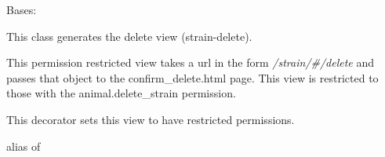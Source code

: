 \documentclass[letterpaper,10pt,english]{sphinxmanual}
\begin{document}
\begin{fulllineitems}
\label{api:mousedb.animal.views.StrainDelete}
Bases: \href{http://docs.djangoproject.com/en/dev/ref/class-based-views/\#django.views.generic.edit.DeleteView}{}

This class generates the delete {\hyperref[api:mousedb.animal.models.Strain]{}} view (strain-delete).

This permission restricted view takes a url in the form \emph{/strain/\#/delete} and passes that object to the confirm\_delete.html page.
This view is restricted to those with the animal.delete\_strain permission.

\begin{fulllineitems}
\label{api:mousedb.animal.views.StrainDelete.context_object_name}
\end{fulllineitems}


\begin{fulllineitems}
\label{api:mousedb.animal.views.StrainDelete.dispatch}
This decorator sets this view to have restricted permissions.

\end{fulllineitems}


\begin{fulllineitems}
\label{api:mousedb.animal.views.StrainDelete.model}
alias of 

\end{fulllineitems}


\begin{fulllineitems}
\label{api:mousedb.animal.views.StrainDelete.success_url}
\end{fulllineitems}


\begin{fulllineitems}
\label{api:mousedb.animal.views.StrainDelete.template_name}
\end{fulllineitems}


\end{fulllineitems}
\end{document}
